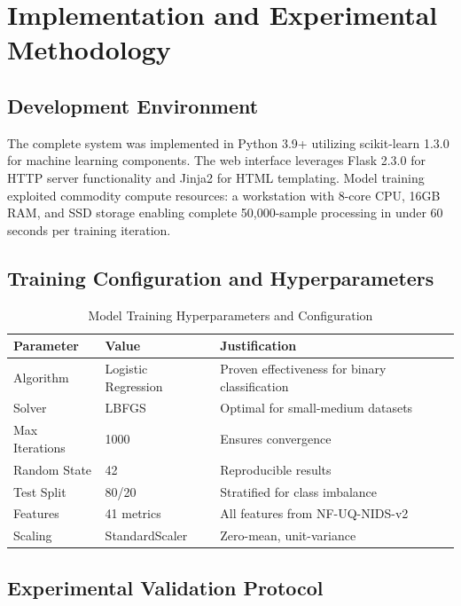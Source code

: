 \documentclass[conference]{IEEEtran}
\begin{document}
\section{Implementation and Experimental Methodology}

\subsection{Development Environment}

The complete system was implemented in Python 3.9+ utilizing scikit-learn 1.3.0 for machine learning components. The web interface leverages Flask 2.3.0 for HTTP server functionality and Jinja2 for HTML templating. Model training exploited commodity compute resources: a workstation with 8-core CPU, 16GB RAM, and SSD storage enabling complete 50,000-sample processing in under 60 seconds per training iteration.

\subsection{Training Configuration and Hyperparameters}

\begin{table}[H]
\centering
\caption{Model Training Hyperparameters and Configuration}
\begin{tabular}{|l|l|p{5.5cm}|}
\hline
\textbf{Parameter} & \textbf{Value} & \textbf{Justification} \\
\hline
Algorithm & Logistic Regression & Proven effectiveness for binary classification \\
\hline
Solver & LBFGS & Optimal for small-medium datasets \\
\hline
Max Iterations & 1000 & Ensures convergence \\
\hline
Random State & 42 & Reproducible results \\
\hline
Test Split & 80/20 & Stratified for class imbalance \\
\hline
Features & 41 metrics & All features from NF-UQ-NIDS-v2 \\
\hline
Scaling & StandardScaler & Zero-mean, unit-variance \\
\hline
\end{tabular}
\end{table}

\subsection{Experimental Validation Protocol}
\end{document}
